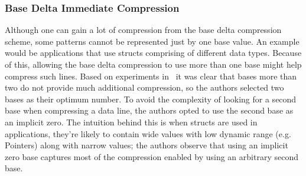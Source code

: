 \subsubsection{Base Delta Immediate Compression}
Although one can gain a lot of compression from the base delta compression scheme, some patterns cannot be represented just by one base value. An example would be applications that use structs comprising of different data types. Because of this, allowing the base delta compression to use more than one base might help compress such lines. Based on experiments in~\cite{bdi} it was clear that bases more than two do not provide much additional compression, so the authors selected two bases as their optimum number. To avoid the complexity of looking for a second base when compressing a data line, the authors opted to use the second base as an implicit zero. The intuition behind this is when structs are used in applications, they're likely to contain wide values with low dynamic range (e.g. Pointers) along with narrow values; the authors observe that using an implicit zero base captures most of the compression enabled by using an arbitrary second base.
